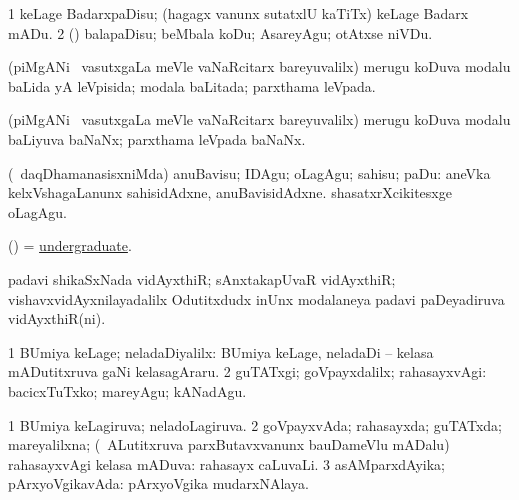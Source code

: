 \bentry
{} 
\gl{\sakirx}
\expl{}
\bmng
\bnum
\num{1} keLage BadarxpaDisu; (hagagx \mo vanunx sutatxlU kaTiTx) keLage Badarx mADu. 
\num{2} (\rUpa) balapaDisu; beMbala koDu; AsareyAgu; otAtxse niVDu. 
\enum
\emng
\eentry

\bentry
{} 
\gl{\gu}
\expl{}
\bmng
 (piMgANi \mo\ vasutxgaLa meVle vaNaRcitarx bareyuvalilx) merugu koDuva modalu baLida yA leVpisida; modala baLitada; parxthama leVpada. 
\emng
\eentry

\bentry
{} 
\gl{\nA}
\expl{}
\bmng
 (piMgANi \mo\ vasutxgaLa meVle vaNaRcitarx bareyuvalilx) merugu koDuva modalu baLiyuva baNaNx; parxthama leVpada baNaNx. 
\emng
\eentry

\bentry
{} 
\gl{\sakirx}
\bmng
(\kanmu\ daqDhamanasisxniMda) anuBavisu; IDAgu; oLagAgu; sahisu; paDu:  aneVka kelxVshagaLanunx sahisidAdxne, anuBavisidAdxne.  shasatxrXcikitesxge oLagAgu. 
\emng
\eentry

\bentry
{} 
\gl{\nA}
\expl{}
\bmng
 (\AmA) = \hyperlink{undergraduate}{undergraduate}. 
\emng
\eentry

\bentry
{} 
\gl{\nA}
\expl{}
\bmng
 padavi shikaSxNada vidAyxthiR; sAnxtakapUvaR vidAyxthiR; vishavxvidAyxnilayadalilx Odutitxdudx inUnx modalaneya padavi paDeyadiruva vidAyxthiR(ni). 
\emng
\eentry

\bentry
{} 
\gl{\kirxvi}
\expl{}
\bmng
\bnum
\num{1} BUmiya keLage; neladaDiyalilx:  BUmiya keLage, neladaDi -- kelasa mADutitxruva gaNi kelasagAraru. 
\num{2} guTATxgi; goVpayxdalilx; rahasayxvAgi:  bacicxTuTxko; mareyAgu; kANadAgu. 
\enum
\emng
\eentry

\bentry
{} 
\gl{\gu}
\expl{}
\bmng
\bnum
\num{1} BUmiya keLagiruva; neladoLagiruva. 
\num{2} goVpayxvAda; rahasayxda; guTATxda; mareyalilxna; (\kanmu\ ALutitxruva parxButavxvanunx bauDameVlu mADalu) rahasayxvAgi kelasa mADuva:  rahasayx caLuvaLi. 
\num{3} asAMparxdAyika; pArxyoVgikavAda:  pArxyoVgika mudarxNAlaya. 
\enum
\emng

